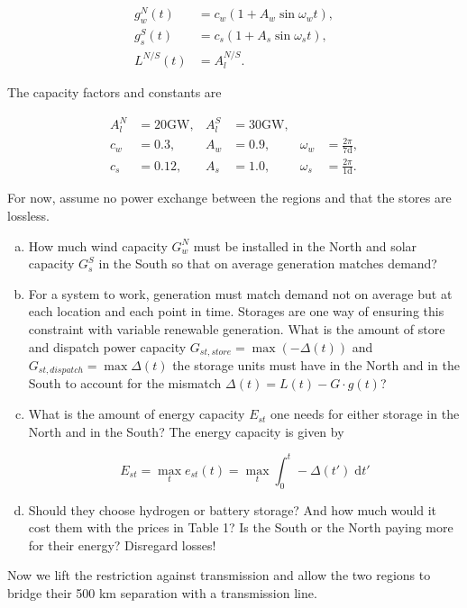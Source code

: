 \documentclass[11pt,a4paper,fleqn]{scrartcl}
\begin{document}
\vspace{-0.5em}

\begin{align*}
 g_{w}^N(t) & = c_w(1+A_w \sin \omega_w t), \\
 g_{s}^S(t) & = c_s(1+A_s \sin \omega_s t), \\
 L^{N/S}(t) & = A_{l}^{N/S}.
\end{align*}

The capacity factors and constants are

\begin{align*}
 A_{l}^{N} & = 20 \si{\giga\watt}, & A_{l}^{S} & = 30 \si{\giga\watt},                                         \\
 c_w    & = 0.3,                & A_w     & = 0.9,                & \omega_w & = \frac{2\pi}{7 \text{d}}, \\
 c_s    & = 0.12,               & A_s     & = 1.0,                & \omega_s & = \frac{2\pi}{1 \text{d}}.
\end{align*}

For now, assume no power exchange between the regions and that the stores are lossless.

\begin{enumerate}[(a)]
 \item How much wind capacity $G^{N}_{w}$ must be installed in the North and solar capacity $G_s^S$ in the South so that on average generation matches demand?

 \item For a system to work, generation must match demand not on average but at each location and each point in time. Storages are one way of ensuring this constraint with variable renewable generation. What is the amount of store and dispatch power capacity $G_{st,store}=\max(-\Delta(t))$ and $G_{st,dispatch} = \max \Delta(t)$ the storage units must have in the North and in the South to account for the mismatch $\Delta(t)=L(t)-G\cdot g(t)$?
\newpage
 \item What is the amount of energy capacity $E_{st}$ one needs for either storage in the North and in the South? The energy capacity is given by

       \begin{equation*}
        E_{st} = \max_t e_{st}(t) = \max_t \int_{0}^{t} -\Delta(t') \;\mathrm{d}t'
       \end{equation*}

 \item Should they choose hydrogen or battery storage? And how much would it cost them with the prices in Table 1? Is the South or the North paying more for their energy? Disregard losses!


\end{enumerate}
Now we lift the restriction against transmission and allow the two regions to bridge their 500 km separation with a transmission line.
\end{document}
